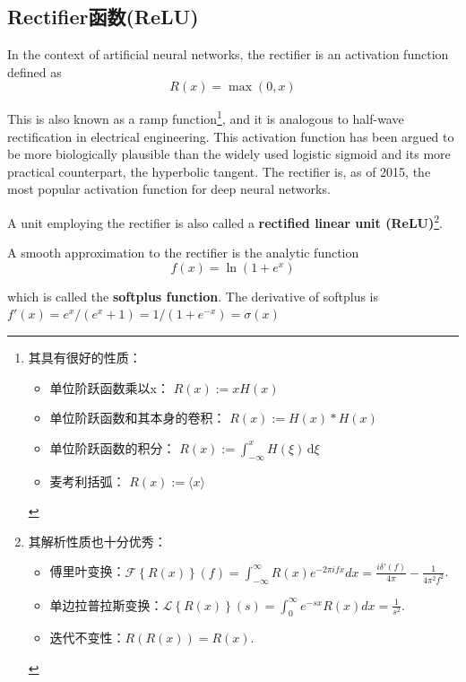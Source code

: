 \documentclass[11pt,fleqn, UTF8]{ctexbook} %
\begin{document}
\subsection{Rectifier函数(ReLU)}
In the context of artificial neural networks, the rectifier is an activation function defined as
\begin{equation*}
  R(x) = \max(0, x)
\end{equation*}

This is also known as a ramp function\footnote{
其具有很好的性质：
\begin{itemize}
  \item 单位阶跃函数乘以x：
  $R\left( x \right) := xH\left( x \right)$
  \item 单位阶跃函数和其本身的卷积：
  $R\left( x \right) := H\left( x \right) * H\left( x \right)$
  \item 单位阶跃函数的积分：
  $R(x) := \int_{-\infty}^{x} H(\xi)\,\mathrm{d}\xi$
  \item 麦考利括弧：
  $R(x) := \langle x\rangle$
\end{itemize}
}, and it is analogous to half-wave rectification in electrical engineering. This activation function has been argued to be more biologically plausible than the widely used logistic sigmoid and its more practical counterpart, the hyperbolic tangent. The rectifier is, as of 2015, the most popular activation function for deep neural networks.

A unit employing the rectifier is also called a \textbf{rectified linear unit (ReLU)}\footnote{
其解析性质也十分优秀：
\begin{itemize}
  \item 傅里叶变换：$ \mathcal{F}\left\{ R(x) \right\}(f)   =   \int_{-\infty}^{\infty}R(x) e^{-2\pi ifx}dx   =   \frac{i\delta '(f)}{4\pi}-\frac{1}{4\pi^{2}f^{2}}$.
  \item 单边拉普拉斯变换：$ \mathcal{L}\left\{ R\left( x \right)\right\} (s) = \int_{0}^{\infty} e^{-sx}R(x)dx = \frac{1}{s^2}$.
  \item 迭代不变性：$ R \left( R \left( x \right) \right) = R \left( x \right) $.
\end{itemize}
}.

A smooth approximation to the rectifier is the analytic function
\begin{equation*}
  f(x) = \ln(1 + e^x)
\end{equation*}

which is called the \textbf{softplus function}. The derivative of softplus is $f'(x) = e^x / (e^x+1) = 1 / (1 + e^{-x})=\sigma(x)$
\end{document}

